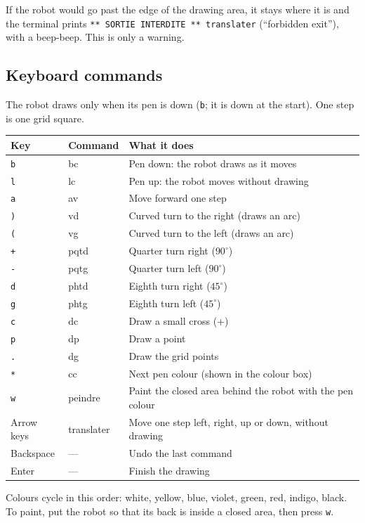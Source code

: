\documentclass[11pt,a4paper]{article}
\newcommand{\kbd}[1]{\texttt{#1}}
\begin{document}
If the robot would go past the edge of the drawing area, it stays where it
is and the terminal prints \kbd{** SORTIE INTERDITE ** translater}
(``forbidden exit''), with a beep-beep. This is only a warning.

\subsection{Keyboard commands}
The robot draws only when its pen is down (\kbd{b}; it is down at the
start). One step is one grid square.

\begin{center}
\begin{tabularx}{\linewidth}{@{}l l L@{}}
\toprule
\textbf{Key} & \textbf{Command} & \textbf{What it does} \\
\midrule
\kbd{b} & bc & Pen down: the robot draws as it moves \\
\kbd{l} & lc & Pen up: the robot moves without drawing \\
\kbd{a} & av & Move forward one step \\
\kbd{)} & vd & Curved turn to the right (draws an arc) \\
\kbd{(} & vg & Curved turn to the left (draws an arc) \\
\kbd{+} & pqtd & Quarter turn right ($90^\circ$) \\
\kbd{-} & pqtg & Quarter turn left ($90^\circ$) \\
\kbd{d} & phtd & Eighth turn right ($45^\circ$) \\
\kbd{g} & phtg & Eighth turn left ($45^\circ$) \\
\kbd{c} & dc & Draw a small cross (+) \\
\kbd{p} & dp & Draw a point \\
\kbd{.} & dg & Draw the grid points \\
\kbd{*} & cc & Next pen colour (shown in the colour box) \\
\kbd{w} & peindre & Paint the closed area behind the robot with the pen colour \\
Arrow keys & translater & Move one step left, right, up or down, without drawing \\
Backspace & --- & Undo the last command \\
Enter & --- & Finish the drawing \\
\bottomrule
\end{tabularx}
\end{center}

Colours cycle in this order: white, yellow, blue, violet, green, red,
indigo, black. To paint, put the robot so that its back is inside a closed
area, then press \kbd{w}.
\end{document}
